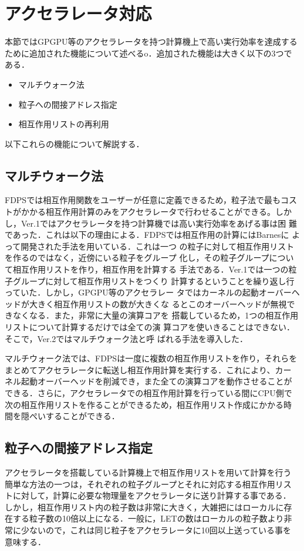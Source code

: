 \documentclass[submit]{ipsj}
\begin{document}
\section{アクセラレータ対応}
\label{sec:acc}

本節ではGPGPU等のアクセラレータを持つ計算機上で高い実行効率を達成する
ために追加された機能について述べるo．追加された機能は大きく以下の3つで
ある．

\begin{itemize}
\item マルチウォーク法
\item 粒子への間接アドレス指定 
\item 相互作用リストの再利用
\end{itemize}

以下これらの機能について解説する．

\subsection{マルチウォーク法}

FDPSでは相互作用関数をユーザーが任意に定義できるため，粒子法で最もコス
トがかかる相互作用計算のみをアクセラレータで行わせることができる。しか
し，Ver.1ではアクセラレータを持つ計算機では高い実行効率をあげる事は困
難であった．これは以下の理由による．FDPSでは相互作用の計算にはBarnesに
よって開発された手法\cite{1990JCoPh..87..161B}を用いている．これは一つ
の粒子に対して相互作用リストを作るのではなく，近傍にいる粒子をグループ
化し，その粒子グループについて相互作用リストを作り，相互作用を計算する
手法である．Ver.1では一つの粒子グループに対して相互作用リストをつくり
計算するということを繰り返し行っていた．しかし，GPGPU等のアクセラレー
タではカーネルの起動オーバーヘッドが大きく相互作用リストの数が大きくな
るとこのオーバーヘッドが無視できなくなる．また，非常に大量の演算コアを
搭載しているため，1つの相互作用リストについて計算するだけでは全ての演
算コアを使いきることはできない．そこで，Ver.2ではマルチウォーク法と呼
ばれる手法を導入した．

マルチウォーク法では、FDPSは一度に複数の相互作用リストを作り，それらを
まとめてアクセラレータに転送し相互作用計算を実行する．これにより、カー
ネル起動オーバーヘッドを削減でき，また全ての演算コアを動作させることが
できる．さらに，アクセラレータでの相互作用計算を行っている間にCPU側で
次の相互作用リストを作ることができるため，相互作用リスト作成にかかる時
間を隠ぺいすることができる．

\subsection{粒子への間接アドレス指定}
\label{sec:adr}
アクセラレータを搭載している計算機上で相互作用リストを用いて計算を行う
簡単な方法の一つは，それぞれの粒子グループとそれに対応する相互作用リス
トに対して，計算に必要な物理量をアクセラレータに送り計算する事である．
しかし，相互作用リスト内の粒子数は非常に大きく，大雑把にはローカルに存
在する粒子数の10倍以上になる．一般に，LETの数はローカルの粒子数より非
常に少ないので，これは同じ粒子をアクセラレータに10回以上送っている事を
意味する．
\end{document}
